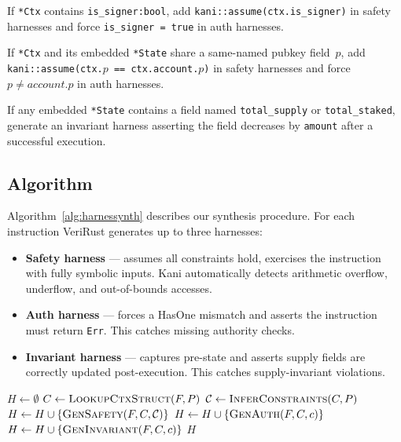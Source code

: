 \documentclass[sigconf,review,anonymous]{acmart}
\begin{document}
\begin{description}[leftmargin=*,noitemsep]
  \item[Signer.] If \texttt{*Ctx} contains \texttt{is\_signer:\allowbreak bool},
    add \texttt{kani::assume(\allowbreak ctx.is\_signer)} in safety harnesses and
    force \texttt{is\_signer\,=\,true} in auth harnesses.
  \item[HasOne.] If \texttt{*Ctx} and its embedded \texttt{*State}
    share a same-named pubkey field~$p$, add
    \texttt{kani::assume(ctx.\allowbreak$p$\,==\,ctx.account.$p$)} in safety
    harnesses and force $p \neq \textit{account}.p$ in auth harnesses.
  \item[SupplyInvariant.] If any embedded \texttt{*State} contains a
    field named \texttt{total\_supply} or \texttt{total\_staked},
    generate an invariant harness asserting the field decreases by
    \texttt{amount} after a successful execution.
\end{description}

\subsection{Algorithm}
\label{sec:algorithm}

Algorithm~\ref{alg:harnessynth} describes our synthesis procedure.
For each instruction VeriRust generates up to three harnesses:

\begin{itemize}[leftmargin=*,noitemsep]
  \item \textbf{Safety harness} --- assumes all constraints hold,
    exercises the instruction with fully symbolic inputs.
    Kani automatically detects arithmetic overflow, underflow, and
    out-of-bounds accesses.
  \item \textbf{Auth harness} --- forces a HasOne mismatch and asserts
    the instruction must return \texttt{Err}.
    This catches missing authority checks.
  \item \textbf{Invariant harness} --- captures pre-state and asserts
    supply fields are correctly updated post-execution.
    This catches supply-invariant violations.
\end{itemize}

\begin{algorithm}[t]
\caption{\textsc{HarnessSynth}$(P)$}
\label{alg:harnessynth}
\footnotesize
\begin{algorithmic}[1]
\State $H \leftarrow \emptyset$
  \State $C \leftarrow \textsc{LookupCtxStruct}(F, P)$
  \State $\mathcal{C} \leftarrow \textsc{InferConstraints}(C, P)$
  \State $H \leftarrow H \cup \{\textsc{GenSafety}(F, C, \mathcal{C})\}$
    \State $H \leftarrow H \cup \{\textsc{GenAuth}(F, C, c)\}$
  \EndIf
    \State $H \leftarrow H \cup \{\textsc{GenInvariant}(F, C, c)\}$
  \EndIf
\EndFor
\State \Return $H$
\end{algorithmic}
\end{algorithm}
\end{document}
